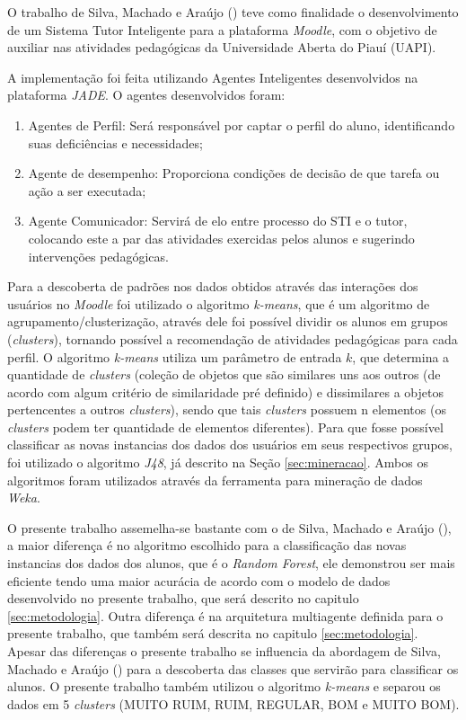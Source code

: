 O trabalho de Silva, Machado e Araújo (\citeyear{silva2014sistema}) teve como finalidade o desenvolvimento de um Sistema Tutor Inteligente para a plataforma \textit{Moodle}, com o objetivo de auxiliar nas atividades pedagógicas da Universidade Aberta do Piauí (UAPI).

A implementação foi feita utilizando Agentes Inteligentes desenvolvidos na plataforma \textit{JADE}. O agentes desenvolvidos foram:

\begin{enumerate}
\item Agentes de Perfil: Será responsável por captar o perfil do aluno, identificando suas deficiências e necessidades;
\item Agente de desempenho: Proporciona condições de decisão de que tarefa ou ação a ser executada;
\item Agente Comunicador: Servirá de elo entre processo do STI e o tutor, colocando este a par das atividades exercidas pelos alunos e sugerindo intervenções pedagógicas.
\end{enumerate}

Para a descoberta de padrões nos dados obtidos através das interações dos usuários no \textit{Moodle} foi utilizado o algoritmo \textit{k-means}, que é um algoritmo de agrupamento/clusterização, através dele foi possível dividir os alunos em grupos (\textit{clusters}), tornando possível a recomendação de atividades pedagógicas para cada perfil. O algoritmo \textit{k-means} utiliza um parâmetro de entrada $k$, que determina a quantidade de \textit{clusters} (coleção de objetos que são similares uns aos outros (de acordo com algum critério de similaridade pré definido) e dissimilares a objetos pertencentes a outros \textit{clusters}), sendo que tais \textit{clusters} possuem n elementos (os \textit{clusters} podem ter quantidade de elementos diferentes). Para que fosse possível classificar as novas instancias dos dados dos usuários em seus respectivos grupos, foi utilizado o algoritmo \textit{J48}, já descrito na Seção \ref{sec:mineracao}. Ambos os algoritmos foram utilizados através da ferramenta para mineração de dados \textit{Weka}.

O presente trabalho assemelha-se bastante com o de Silva, Machado e Araújo (\citeyear{silva2014sistema}), a maior diferença é no algoritmo escolhido para a classificação das novas instancias dos dados dos alunos, que é o \textit{Random Forest}, ele demonstrou ser mais eficiente tendo uma maior acurácia de acordo com o modelo de dados desenvolvido no presente trabalho, que será descrito no capitulo \ref{sec:metodologia}. Outra diferença é na arquitetura multiagente definida para o presente trabalho, que também será descrita no capitulo \ref{sec:metodologia}. Apesar das diferenças o presente trabalho se influencia da abordagem de Silva, Machado e Araújo (\citeyear{silva2014sistema}) para a descoberta das classes que servirão para classificar os alunos. O presente trabalho também utilizou o algoritmo \textit{k-means} e separou os dados em 5 \textit{clusters} (MUITO RUIM, RUIM, REGULAR, BOM e MUITO BOM).

